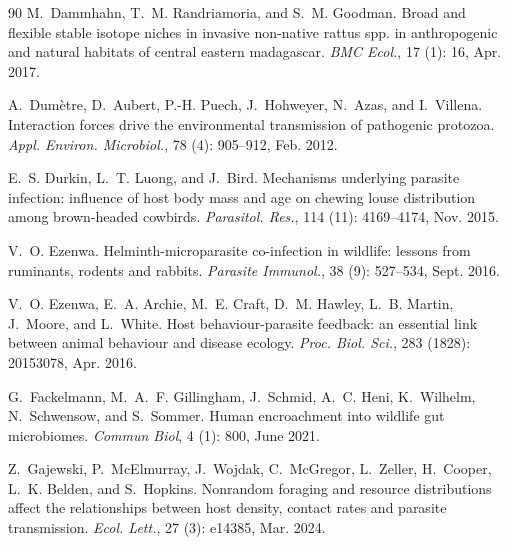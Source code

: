 \documentclass[oneside, a4paper, onecolumn, 11pt]{article}
\begin{document}
\begin{thebibliography}{90}
M.~Dammhahn, T.~M. Randriamoria, and S.~M. Goodman.
\newblock Broad and flexible stable isotope niches in invasive non-native rattus spp. in anthropogenic and natural habitats of central eastern madagascar.
\newblock \emph{BMC Ecol.}, 17 (1): 16, Apr. 2017.

A.~Dumètre, D.~Aubert, P.-H. Puech, J.~Hohweyer, N.~Azas, and I.~Villena.
\newblock Interaction forces drive the environmental transmission of pathogenic protozoa.
\newblock \emph{Appl. Environ. Microbiol.}, 78 (4): 905--912, Feb. 2012.

E.~S. Durkin, L.~T. Luong, and J.~Bird.
\newblock Mechanisms underlying parasite infection: influence of host body mass and age on chewing louse distribution among brown-headed cowbirds.
\newblock \emph{Parasitol. Res.}, 114 (11): 4169--4174, Nov. 2015.

V.~O. Ezenwa.
\newblock Helminth-microparasite co-infection in wildlife: lessons from ruminants, rodents and rabbits.
\newblock \emph{Parasite Immunol.}, 38 (9): 527--534, Sept. 2016.

V.~O. Ezenwa, E.~A. Archie, M.~E. Craft, D.~M. Hawley, L.~B. Martin, J.~Moore, and L.~White.
\newblock Host behaviour-parasite feedback: an essential link between animal behaviour and disease ecology.
\newblock \emph{Proc. Biol. Sci.}, 283 (1828): 20153078, Apr. 2016.

G.~Fackelmann, M.~A.~F. Gillingham, J.~Schmid, A.~C. Heni, K.~Wilhelm, N.~Schwensow, and S.~Sommer.
\newblock Human encroachment into wildlife gut microbiomes.
\newblock \emph{Commun Biol}, 4 (1): 800, June 2021.

Z.~Gajewski, P.~McElmurray, J.~Wojdak, C.~McGregor, L.~Zeller, H.~Cooper, L.~K. Belden, and S.~Hopkins.
\newblock Nonrandom foraging and resource distributions affect the relationships between host density, contact rates and parasite transmission.
\newblock \emph{Ecol. Lett.}, 27 (3): e14385, Mar. 2024.


\end{thebibliography}
\end{document}
